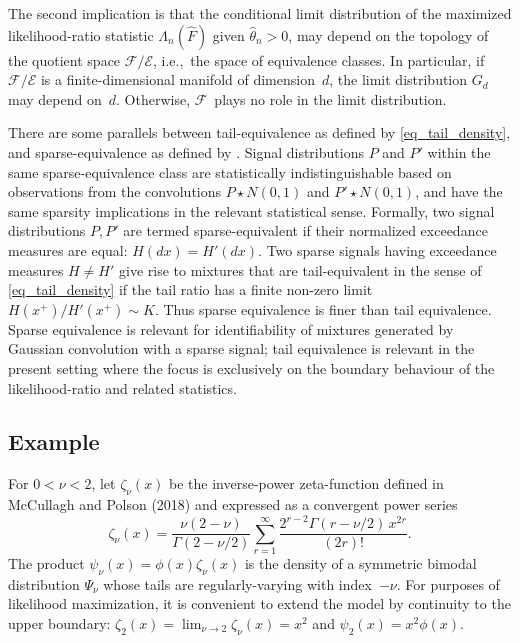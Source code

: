 \documentclass[11pt]{article}
\theoremstyle{definition}
\def\F{{\mathcal F}}
\def\E{{\mathcal E}}
\begin{document}
The second implication is that the conditional limit distribution of the maximized likelihood-ratio statistic
$\Lambda_n(\hat F)$ given $\hat\theta_n > 0$, may depend on the topology of the quotient space $\F/\E$, i.e.,~the space of equivalence classes.
In particular, if $\F/\E$ is a finite-dimensional manifold of dimension~$d$, the limit distribution $G_d$ may depend on~$d$.  Otherwise, $\F$~plays no role in the limit distribution.

There are some parallels between tail-equivalence as defined by \eqref{eq_tail_density}, and sparse-equivalence as defined by \citet{McCP}. Signal distributions $P$ and $P'$ within the same sparse-equivalence class are statistically indistinguishable based on observations from the convolutions $P\star  N(0,1)$ and $P' \star N(0,1)$, and have the same sparsity implications in the relevant statistical sense. Formally, two signal distributions $P, P'$ are termed sparse-equivalent if their normalized exceedance measures are equal: $H(dx) = H'(dx)$. Two sparse signals having exceedance measures $H\neq H'$ give rise to mixtures that are tail-equivalent in the sense of \eqref{eq_tail_density} if the tail ratio  has a finite non-zero  limit $H(x^+) /H'(x^+) \sim K$.  Thus sparse equivalence is finer than tail equivalence. Sparse equivalence is relevant for identifiability of mixtures generated by Gaussian convolution with a sparse signal; tail equivalence is relevant in the present setting where the focus is exclusively on the boundary behaviour of the likelihood-ratio and related statistics.


\subsection{Example}\label{secExample}
For $0 < \nu < 2$, let $\zeta_\nu(x)$ be the inverse-power zeta-function defined in
McCullagh and Polson (2018) and expressed as a convergent power series
\[
\zeta_\nu(x) = \frac{\nu(2-\nu)} {\Gamma(2 - \nu/2)} \sum_{r=1}^\infty \frac{2^{r-2} \Gamma(r - \nu/2)\, x^{2r}} {(2r)!}.
\]
The product $\psi_\nu(x) = \phi(x) \zeta_\nu(x)$ is the density of a symmetric bimodal distribution $\Psi_\nu$ whose tails are regularly-varying with index~$-\nu$.
For purposes of likelihood maximization, it is convenient to extend the model by continuity to the upper boundary: $\zeta_2(x) = \lim_{\nu\to 2} \zeta_\nu(x) = x^2$ and $\psi_2(x) = x^2 \phi(x)$.
\end{document}
